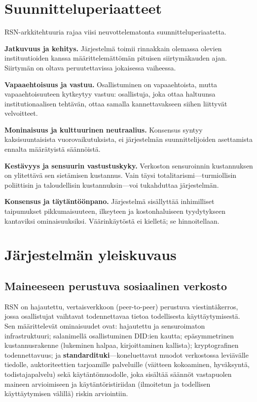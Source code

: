 \documentclass[11pt,a4paper,twocolumn]{article}
\begin{document}
\section{Suunnitteluperiaatteet}

RSN-arkkitehtuuria rajaa viisi neuvottelematonta suunnitteluperiaatetta.

\textbf{Jatkuvuus ja kehitys.} Järjestelmä toimii rinnakkain olemassa olevien instituutioiden kanssa määrittelemättömän pituisen siirtymäkauden ajan. Siirtymän on oltava peruutettavissa jokaisessa vaiheessa.

\textbf{Vapaaehtoisuus ja vastuu.} Osallistuminen on vapaaehtoista, mutta vapaaehtoisuuteen kytkeytyy vastuu: osallistuja, joka ottaa haltuunsa institutionaalisen tehtävän, ottaa samalla kannettavakseen siihen liittyvät velvoitteet.

\textbf{Moninaisuus ja kulttuurinen neutraalius.} Konsensus syntyy kaksisuuntaisista vuorovaikutuksista, ei järjestelmän suunnittelijoiden asettamista ennalta määrätyistä säännöistä.

\textbf{Kestävyys ja sensuurin vastustuskyky.} Verkoston sensuroinnin kustannuksen on ylitettävä sen sietämisen kustannus. Vain täysi totalitarismi---turmiollisin poliittisin ja taloudellisin kustannuksin---voi tukahduttaa järjestelmän.

\textbf{Konsensus ja täytäntöönpano.} Järjestelmä sisällyttää inhimilliset taipumukset pikkumaisuuteen, ilkeyteen ja kostonhaluiseen tyydytykseen kantaviksi ominaisuuksiksi. Väärinkäytöstä ei kielletä; se hinnoitellaan.

\section{Järjestelmän yleiskuvaus}

\subsection{Maineeseen perustuva sosiaalinen verkosto}

RSN on hajautettu, vertaisverkkoon (peer-to-peer) perustuva viestintäkerros, jossa osallistujat vaihtavat todennettavaa tietoa todellisesta käyttäytymisestä. Sen määrittelevät ominaisuudet ovat: hajautettu ja sensuroimaton infrastruktuuri; salanimellä osallistuminen DID:ien kautta; epäsymmetrinen kustannusrakenne (lukeminen halpaa, kirjoittaminen kallista); kryptografinen todennettavuus; ja \textbf{standardituki}---koneluettavat muodot verkostossa leviävälle tiedolle, auktoriteettien tarjoamille palveluille (väitteen kokoaminen, hyväksyntä, todistajapalvelu) sekä käytäntömuodolle, joka sisältää säännöt vastapuolen maineen arvioimiseen ja käytäntöristiriidan (ilmoitetun ja todellisen käyttäytymisen välillä) riskin arviointiin.
\end{document}
